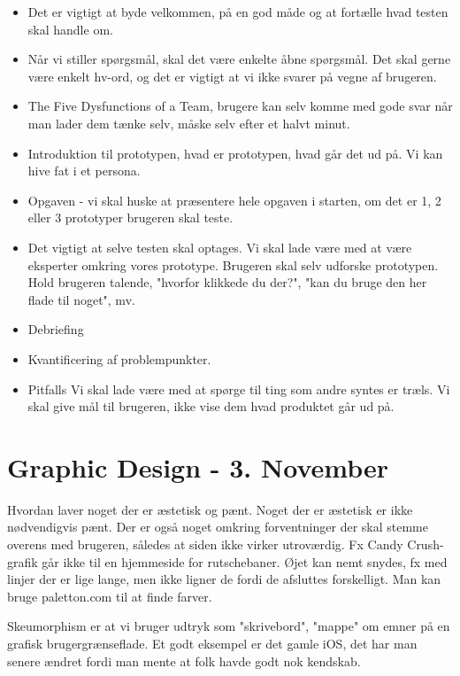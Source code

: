 \documentclass{article}
\begin{document}
\begin{itemize}
  \item Det er vigtigt at byde velkommen, på en god måde og at fortælle hvad
    testen skal handle om.
  \item Når vi stiller spørgsmål, skal det være enkelte åbne spørgsmål. Det skal
    gerne være enkelt hv-ord, og det er vigtigt at vi ikke svarer på vegne af
    brugeren.
  \item The Five Dysfunctions of a Team, brugere kan selv komme med gode svar
    når man lader dem tænke selv, måske selv efter et halvt minut. 
  \item Introduktion til prototypen, hvad er prototypen, hvad går det ud på. Vi
    kan hive fat i et persona. 
  \item Opgaven - vi skal huske at præsentere hele opgaven i starten, om det er
    1, 2 eller 3 prototyper brugeren skal teste.
  \item Det vigtigt at selve testen skal optages. Vi skal lade være med at være
    eksperter omkring vores prototype. Brugeren skal selv udforske prototypen.
    Hold brugeren talende, "hvorfor klikkede du der?", "kan du bruge den her
    flade til noget", mv.
  \item Debriefing
  \item Kvantificering af problempunkter. 
  \item Pitfalls
    \subitem Vi skal lade være med at spørge til ting som andre syntes er træls.
    Vi skal give mål til brugeren, ikke vise dem hvad produktet går ud på.
\end{itemize}

\newpage
\section{Graphic Design - 3. November} 
Hvordan laver noget der er æstetisk og pænt. Noget der er æstetisk er ikke
nødvendigvis pænt. Der er også noget omkring forventninger der skal stemme
overens med brugeren, således at siden ikke virker utroværdig. Fx Candy
Crush-grafik går ikke til en hjemmeside for rutschebaner.
Øjet kan nemt snydes, fx med linjer der er lige lange, men ikke ligner de fordi
de afsluttes forskelligt. Man kan bruge paletton.com til at finde farver. 

Skeumorphism er at vi bruger udtryk som "skrivebord", "mappe" om emner på en
grafisk brugergrænseflade. Et godt eksempel er det gamle iOS, det har man senere
ændret fordi man mente at folk havde godt nok kendskab.
\end{document}
